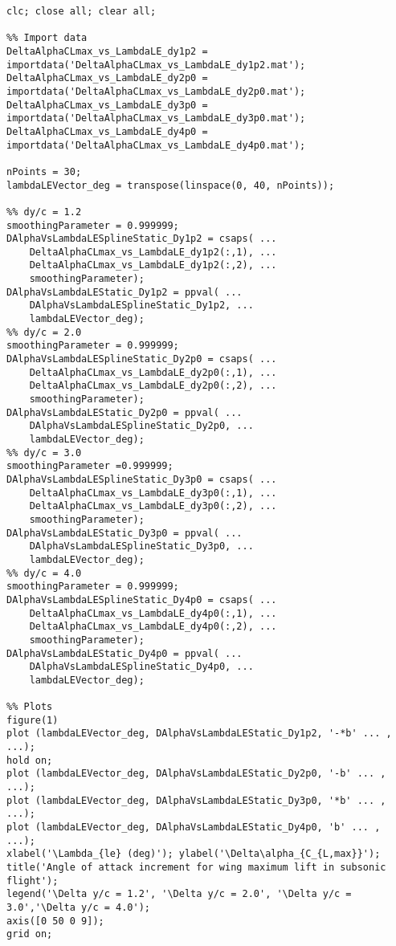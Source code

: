 \bigskip
\lstset{language=Matlab}
\begin{lstlisting}[caption={MATLAB script for creating the HDF Database}, captionpos=b, tabsize=2]
clc; close all; clear all;

%% Import data
DeltaAlphaCLmax_vs_LambdaLE_dy1p2 = importdata('DeltaAlphaCLmax_vs_LambdaLE_dy1p2.mat');
DeltaAlphaCLmax_vs_LambdaLE_dy2p0 = importdata('DeltaAlphaCLmax_vs_LambdaLE_dy2p0.mat');
DeltaAlphaCLmax_vs_LambdaLE_dy3p0 = importdata('DeltaAlphaCLmax_vs_LambdaLE_dy3p0.mat');
DeltaAlphaCLmax_vs_LambdaLE_dy4p0 = importdata('DeltaAlphaCLmax_vs_LambdaLE_dy4p0.mat');

nPoints = 30;
lambdaLEVector_deg = transpose(linspace(0, 40, nPoints));

%% dy/c = 1.2
smoothingParameter = 0.999999;
DAlphaVsLambdaLESplineStatic_Dy1p2 = csaps( ...
    DeltaAlphaCLmax_vs_LambdaLE_dy1p2(:,1), ...
    DeltaAlphaCLmax_vs_LambdaLE_dy1p2(:,2), ...
    smoothingParameter);
DAlphaVsLambdaLEStatic_Dy1p2 = ppval( ...
    DAlphaVsLambdaLESplineStatic_Dy1p2, ...
    lambdaLEVector_deg);
%% dy/c = 2.0
smoothingParameter = 0.999999; 
DAlphaVsLambdaLESplineStatic_Dy2p0 = csaps( ...
    DeltaAlphaCLmax_vs_LambdaLE_dy2p0(:,1), ...
    DeltaAlphaCLmax_vs_LambdaLE_dy2p0(:,2), ...
    smoothingParameter);
DAlphaVsLambdaLEStatic_Dy2p0 = ppval( ...
    DAlphaVsLambdaLESplineStatic_Dy2p0, ...
    lambdaLEVector_deg);
%% dy/c = 3.0
smoothingParameter =0.999999;
DAlphaVsLambdaLESplineStatic_Dy3p0 = csaps( ...
    DeltaAlphaCLmax_vs_LambdaLE_dy3p0(:,1), ...
    DeltaAlphaCLmax_vs_LambdaLE_dy3p0(:,2), ...
    smoothingParameter);
DAlphaVsLambdaLEStatic_Dy3p0 = ppval( ...
    DAlphaVsLambdaLESplineStatic_Dy3p0, ...
    lambdaLEVector_deg);
%% dy/c = 4.0
smoothingParameter = 0.999999; 
DAlphaVsLambdaLESplineStatic_Dy4p0 = csaps( ...
    DeltaAlphaCLmax_vs_LambdaLE_dy4p0(:,1), ...
    DeltaAlphaCLmax_vs_LambdaLE_dy4p0(:,2), ...
    smoothingParameter);
DAlphaVsLambdaLEStatic_Dy4p0 = ppval( ...
    DAlphaVsLambdaLESplineStatic_Dy4p0, ...
    lambdaLEVector_deg);

%% Plots
figure(1)
plot (lambdaLEVector_deg, DAlphaVsLambdaLEStatic_Dy1p2, '-*b' ... , ...);
hold on;
plot (lambdaLEVector_deg, DAlphaVsLambdaLEStatic_Dy2p0, '-b' ... , ...);
plot (lambdaLEVector_deg, DAlphaVsLambdaLEStatic_Dy3p0, '*b' ... , ...);
plot (lambdaLEVector_deg, DAlphaVsLambdaLEStatic_Dy4p0, 'b' ... , ...);
xlabel('\Lambda_{le} (deg)'); ylabel('\Delta\alpha_{C_{L,max}}');
title('Angle of attack increment for wing maximum lift in subsonic flight');
legend('\Delta y/c = 1.2', '\Delta y/c = 2.0', '\Delta y/c = 3.0','\Delta y/c = 4.0');
axis([0 50 0 9]);
grid on;
 

\end{lstlisting}
